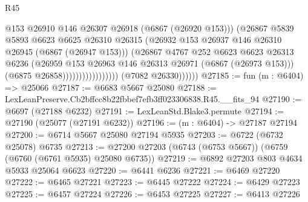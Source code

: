 \begin{lexlean}{R45}
\begin{coremodule}
{                                            @153
                                            @26910
                                            @146
                                            @26307
                                            @26918
                                            (@6867 (@26920 @153)))
                                          (@26867
                                            @5839
                                            @5893
                                            @6623
                                            @6625
                                            @26310
                                            @26315
                                            (@26932
                                              @153
                                              @26937
                                              @146
                                              @26310
                                              @26945
                                              (@6867 (@26947 @153)))
                                            (@26867
                                              @4767
                                              @252
                                              @6623
                                              @6623
                                              @26313
                                              @6236
                                              (@26959
                                                @153
                                                @26963
                                                @146
                                                @26313
                                                @26971
                                                (@6867 (@26973 @153)))
                                              (@6875 @26858)))))))))))))))))
              (@7082 @26330))))))
@27185 := fun (m : @6404) => @25066
@27187 := @6683 @5667 @25080
@27188 := LexLeanPreserve.Cb2bffcc8b22fbbef7efb3ff023306838.R45.__fits_94
@27190 := @6697 (@27188 @6232)
@27191 := LexLeanStd.Blake3.permute
@27194 := @27190 (@25077 (@27191 @6232))
@27196 := (m : @6404) -> @27187 @27194
@27200 := @6714 @5667 @25080 @27194 @5935
@27203 := @6722 (@6732 @25078) @6735
@27213 := @27200 @27203 (@6743 (@6753 @5667)) (@6759 (@6760 (@6761 @5935) @25080 @6735))
@27219 := @6892 @27203 @803 @4634 @5933 @25064 @6623
@27220 := @6441 @6236
@27221 := @6469 @27220
@27222 := @6465 @27221
@27223 := @6445 @27222
@27224 := @6429 @27223
@27225 := @6457 @27224
@27226 := @6453 @27225
@27227 := @6413 @27226
}
\end{coremodule}
\end{lexlean}
